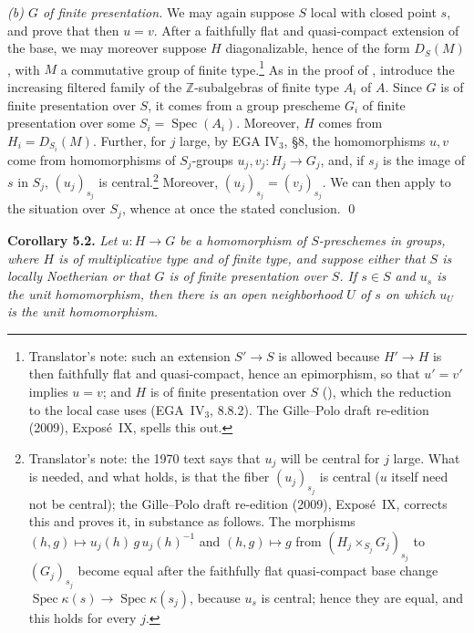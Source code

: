 \smallskip
{}\noindent\textit{(b) \(G\) of finite presentation.}
We may again suppose \(S\) local with closed point \(s\), and prove that
then \(u=v\). After a faithfully flat and quasi-compact extension of the
base, we may moreover suppose \(H\) diagonalizable, hence of the form
\(D_S(M)\), with \(M\) a commutative group of finite type.\footnote{Translator's
note: such an extension \(S'\to S\) is allowed because \(H'\to H\) is then
faithfully flat and quasi-compact, hence an epimorphism, so that
\(u'=v'\) implies \(u=v\); and \(H\) is of finite presentation over \(S\)
(), which the
reduction to the local case uses (EGA~IV\(_3\), 8.8.2). The Gille--Polo
draft re-edition (2009), Expos\'e~IX, spells this out.} As in the proof
of , introduce the increasing
filtered family of the \(\mathbb Z\)-subalgebras of finite type \(A_i\) of
\(A\). Since \(G\) is of finite presentation over \(S\), it comes from a
group prescheme \(G_i\) of finite presentation over some
\(S_i=\operatorname{Spec}(A_i)\). Moreover, \(H\) comes from
\(H_i=D_{S_i}(M)\). Further, for \(j\) large, by EGA IV\(_3\), \S8, the
homomorphisms \(u,v\) come from homomorphisms of \(S_j\)-groups
\(u_j,v_j:H_j\to G_j\), and, if \(s_j\) is the image of \(s\) in \(S_j\),
\((u_j)_{s_j}\) is central.\footnote{Translator's note: the 1970 text says
that \(u_j\) will be central for \(j\) large. What is needed, and what
holds, is that the fiber \((u_j)_{s_j}\) is central (\(u\) itself need not
be central); the Gille--Polo draft re-edition (2009), Expos\'e~IX,
corrects this and proves it, in substance as follows. The morphisms
\((h,g)\mapsto u_j(h)\,g\,u_j(h)^{-1}\) and \((h,g)\mapsto g\) from
\((H_j\times_{S_j}G_j)_{s_j}\) to \((G_j)_{s_j}\) become equal after the
faithfully flat quasi-compact base change
\(\operatorname{Spec}\kappa(s)\to\operatorname{Spec}\kappa(s_j)\), because
\(u_s\) is central; hence they are equal, and this holds for every \(j\).}
Moreover, \((u_j)_{s_j}=(v_j)_{s_j}\). We can then apply
 to the situation over
\(S_j\), whence at once the stated conclusion. \qed

\medskip
\noindent{}\textbf{Corollary 5.2.}
\textit{Let \(u:H\to G\) be a homomorphism of \(S\)-preschemes in
groups, where \(H\) is of multiplicative type and of finite type, and
suppose either that \(S\) is locally Noetherian or that \(G\) is of
finite presentation over \(S\). If \(s\in S\) and \(u_s\) is the unit
homomorphism, then there is an open neighborhood \(U\) of \(s\) on
which \(u_U\) is the unit homomorphism.}

